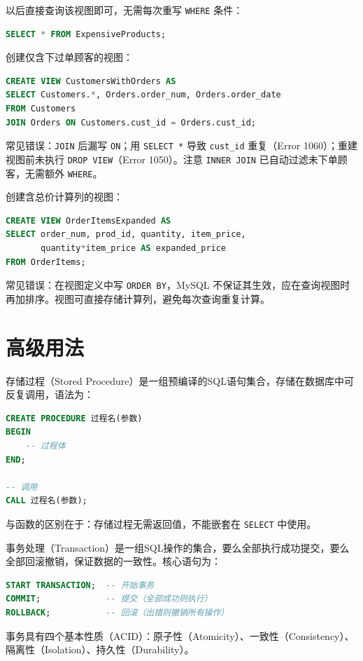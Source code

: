 \begin{example}
以后直接查询该视图即可，无需每次重写 \texttt{WHERE} 条件：

\begin{lstlisting}[language=SQL]
SELECT * FROM ExpensiveProducts;
\end{lstlisting}
\begin{example}[JOIN 视图]
创建仅含下过单顾客的视图：
\begin{lstlisting}[language=SQL]
CREATE VIEW CustomersWithOrders AS
SELECT Customers.*, Orders.order_num, Orders.order_date
FROM Customers
JOIN Orders ON Customers.cust_id = Orders.cust_id;
\end{lstlisting}
常见错误：\texttt{JOIN} 后漏写 \texttt{ON}；用 \texttt{SELECT *} 导致 \texttt{cust\_id} 重复（Error 1060）；重建视图前未执行 \texttt{DROP VIEW}（Error 1050）。注意 \texttt{INNER JOIN} 已自动过滤未下单顾客，无需额外 \texttt{WHERE}。
\end{example}

\begin{example}[计算列视图]
创建含总价计算列的视图：
\begin{lstlisting}[language=SQL]
CREATE VIEW OrderItemsExpanded AS
SELECT order_num, prod_id, quantity, item_price,
       quantity*item_price AS expanded_price
FROM OrderItems;
\end{lstlisting}
常见错误：在视图定义中写 \texttt{ORDER BY}，MySQL 不保证其生效，应在查询视图时再加排序。视图可直接存储计算列，避免每次查询重复计算。
\end{example}
\section{高级用法}
\begin{definition}[存储过程]
存储过程（Stored Procedure）是一组预编译的SQL语句集合，存储在数据库中可反复调用，语法为：
\begin{lstlisting}[language=SQL, frame=single, backgroundcolor=\color{white}]
CREATE PROCEDURE 过程名(参数)
BEGIN
    -- 过程体
END;

-- 调用
CALL 过程名(参数);
\end{lstlisting}
与函数的区别在于：存储过程无需返回值，不能嵌套在 \texttt{SELECT} 中使用。
\end{definition}

\begin{definition}[事务处理]
事务处理（Transaction）是一组SQL操作的集合，要么全部执行成功提交，要么全部回滚撤销，保证数据的一致性。核心语句为：
\begin{lstlisting}[language=SQL, frame=single, backgroundcolor=\color{white}]
START TRANSACTION;  -- 开始事务
COMMIT;             -- 提交（全部成功则执行）
ROLLBACK;           -- 回滚（出错则撤销所有操作）
\end{lstlisting}
事务具有四个基本性质（ACID）：原子性（Atomicity）、一致性（Consistency）、隔离性（Isolation）、持久性（Durability）。
\end{definition}


\end{example}
